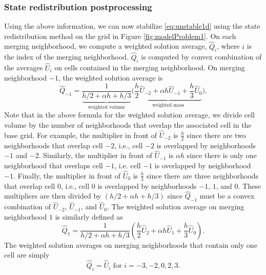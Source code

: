 \subsubsection*{State redistribution postprocessing}
Using the above information, we can now stabilize \eqref{eq:unstable1d} using the state redistribution method on the grid in Figure \ref{fig:modelProblem1}.  
On each merging neighborhood, we compute a weighted solution average, $\widehat Q_i$, where $i$ is the index of the merging neighborhood. 
$\widehat Q_i$ is computed by convex combination of the averages $\widehat{U}_i$ on cells contained in the merging neighborhood. 
On merging neighborhood $-1$, the weighted solution average is
\begin{equation}\label{eq:neigh2}
\widehat{Q}_{-1} = \frac{1}{\underbrace{h/2 + \alpha h + h/3}_{\text{weighted volume}}}\biggr( \underbrace{\frac{h}{2} \widehat{U}_{-2} + \alpha h \widehat{U}_{-1} + \frac{h}{3}\widehat{U}_{0}}_{\text{weighted mass}} \biggr).
\end{equation}
Note that in the above formula for the weighted solution average, we divide cell volume by the number of neighborhoods that overlap the associated cell in the base grid. 
For example, the multiplier in front of $\widehat{U}_{-2}$ is $\frac{h}{2}$ since there are two neighborhoods that overlap cell $-2$, i.e., cell $-2$ is overlapped by neighborhoods $-1$ and $-2$.  
Similarly, the multiplier in front of $\widehat{U}_{-1}$ is $\alpha h$ since there is only one neighborhood that overlaps cell $-1$, i.e. cell $-1$ is overlapped by neighborhood $-1$.
Finally, the multiplier in front of $\widehat{U}_{0}$ is $\frac{h}{3}$ since there are three neighborhoods that overlap cell $0$, i.e., cell $0$ is overlapped by neighborhoods $-1$, $1$, and $0$.
These multipliers are then divided by $(h/2 + \alpha h + h/3)$ since $\widehat{Q}_{-1} $ must be a convex combination of $\widehat{U}_{-2}$, $\widehat{U}_{-1}$, and $\widehat{U}_{0}$.
The weighted solution average on merging neighborhood $1$ is similarly defined as
\begin{equation}\label{eq:neigh3}
\widehat{Q}_{1} = \frac{1}{h/2 + \alpha h + h/3}\left( \frac{h}{2} \widehat{U}_{2} + \alpha h \widehat{U}_{1} + \frac{h}{3}\widehat{U}_{0} \right).
\end{equation}
The weighted solution averages on merging neighborhoods that contain only one cell are simply 
\begin{equation}\label{eq:neigh1}
\widehat{Q}_i = \widehat{U}_i \text{ for } i = -3,-2,0,2,3.
\end{equation}

